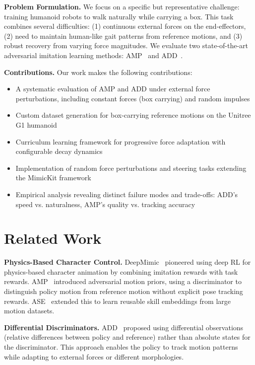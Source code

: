 \documentclass{article}
\begin{document}
\textbf{Problem Formulation.} We focus on a specific but representative challenge: training humanoid robots to walk naturally while carrying a box. This task combines several difficulties: (1) continuous external forces on the end-effectors, (2) need to maintain human-like gait patterns from reference motions, and (3) robust recovery from varying force magnitudes. We evaluate two state-of-the-art adversarial imitation learning methods: AMP~\citep{peng2021amp} and ADD~\citep{zhang2025add}.

\textbf{Contributions.} Our work makes the following contributions:
\begin{itemize}
\item A systematic evaluation of AMP and ADD under external force perturbations, including constant forces (box carrying) and random impulses
\item Custom dataset generation for box-carrying reference motions on the Unitree G1 humanoid
\item Curriculum learning framework for progressive force adaptation with configurable decay dynamics
\item Implementation of random force perturbations and steering tasks extending the MimicKit framework
\item Empirical analysis revealing distinct failure modes and trade-offs: ADD's speed vs. naturalness, AMP's quality vs. tracking accuracy
\end{itemize}

\section{Related Work}

\textbf{Physics-Based Character Control.} DeepMimic~\citep{peng2018deepmimic} pioneered using deep RL for physics-based character animation by combining imitation rewards with task rewards. AMP~\citep{peng2021amp} introduced adversarial motion priors, using a discriminator to distinguish policy motion from reference motion without explicit pose tracking rewards. ASE~\citep{peng2022ase} extended this to learn reusable skill embeddings from large motion datasets.

\textbf{Differential Discriminators.} ADD~\citep{zhang2025add} proposed using differential observations (relative differences between policy and reference) rather than absolute states for the discriminator. This approach enables the policy to track motion patterns while adapting to external forces or different morphologies.
\end{document}
